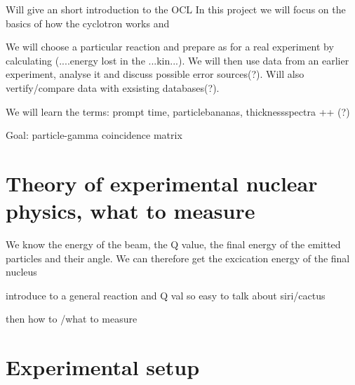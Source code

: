 \documentclass[11pt,a4wide]{article}
\begin{document}
Will give an short introduction to the OCL
In this project we will focus on the basics of how the cyclotron works and 



We will choose a particular reaction and prepare as for a real experiment by calculating (....energy lost in the ...kin...). We will then use data from an earlier experiment, analyse it and discuss possible error sources(?). Will also vertify/compare data with exsisting databases(?).

We will learn the terms: prompt time, particlebananas, thicknessspectra ++ (?)

Goal: particle-gamma coincidence matrix

\section{Theory of experimental nuclear physics, what to measure}

We know the energy of the beam, the Q value, the final energy of the emitted particles and their angle. We can therefore get the excication energy of the final nucleus

introduce to a general reaction and Q val so easy to talk about siri/cactus

then how to /what to measure

\section{Experimental setup}
\end{document}

